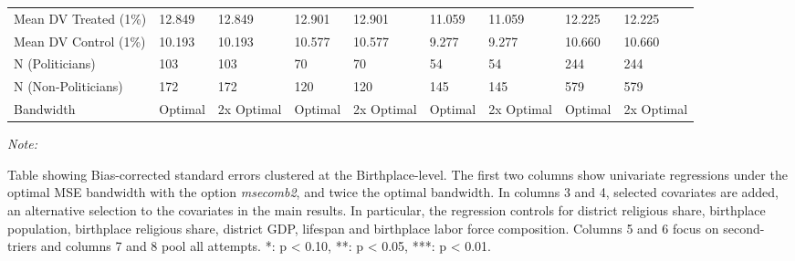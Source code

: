 \begin{table}[!h]
{\begin{threeparttable}
\begin{tabular}[t]{lllllllll}
\hspace{1em}Mean DV Treated (1\%) & 12.849 & 12.849 & 12.901 & 12.901 & 11.059 & 11.059 & 12.225 & 12.225\\
\hspace{1em}Mean DV Control (1\%) & 10.193 & 10.193 & 10.577 & 10.577 & 9.277 & 9.277 & 10.660 & 10.660\\
\hspace{1em}N (Politicians) & 103 & 103 & 70 & 70 & 54 & 54 & 244 & 244\\
\hspace{1em}N (Non-Politicians) & 172 & 172 & 120 & 120 & 145 & 145 & 579 & 579\\
\hspace{1em}Bandwidth & Optimal & 2x Optimal & Optimal & 2x Optimal & Optimal & 2x Optimal & Optimal & 2x Optimal\\
\bottomrule
\end{tabular}
\begin{tablenotes}[para]
\item \textit{Note: } 
\item Table showing Bias-corrected standard errors clustered at the Birthplace-level. The first two columns show univariate regressions under the optimal MSE bandwidth with the option \textit{msecomb2}, and twice the optimal bandwidth. In columns 3 and 4, selected covariates are added, an alternative selection to the covariates in the main results. In particular, the regression controls for district religious share, birthplace population, birthplace religious share, district GDP, lifespan and birthplace labor force composition. Columns 5 and 6 focus on second-triers and columns 7 and 8 pool all attempts. *: p < 0.10, **: p < 0.05, ***: p < 0.01. 
\end{tablenotes}
\end{threeparttable}}
\end{table}
